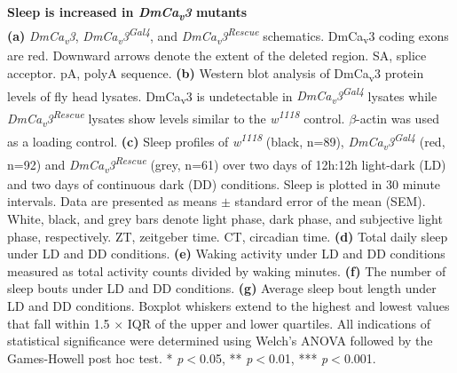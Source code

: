 \label{fig:3}
\textbf{Sleep is increased in \emph{DmCa\textsubscript{v}3} mutants}
\\
\textbf{(a)} \emph{DmCa\textsubscript{v}3}, \emph{DmCa\textsubscript{v}3\textsuperscript{Gal4}}, and \emph{DmCa\textsubscript{v}3\textsuperscript{Rescue}} schematics. 
DmCa\textsubscript{v}3 coding exons are red.
Downward arrows denote the extent of the deleted region.
SA, splice acceptor.
pA, polyA sequence.  
\textbf{(b)} Western blot analysis of DmCa\textsubscript{v}3 protein levels of fly head lysates.
DmCa\textsubscript{v}3 is undetectable in \emph{DmCa\textsubscript{v}3\textsuperscript{Gal4}} lysates while \emph{DmCa\textsubscript{v}3\textsuperscript{Rescue}} lysates show levels similar to the \emph{w\textsuperscript{1118}} control.
$\beta$-actin was used as a loading control.
\textbf{(c)} Sleep profiles of \emph{w\textsuperscript{1118}} (black, n=89), \emph{DmCa\textsubscript{v}3\textsuperscript{Gal4}} (red, n=92) and \emph{DmCa\textsubscript{v}3\textsuperscript{Rescue}}  (grey, n=61) over two days of 12h:12h light-dark (LD) and two days of continuous dark (DD) conditions.
Sleep is plotted in 30 minute intervals.
Data are presented as means $\pm$ standard error of the mean (SEM).
White, black, and grey bars denote light phase, dark phase, and subjective light phase, respectively.
ZT, zeitgeber time.
CT, circadian time.
\textbf{(d)} Total daily sleep under LD and DD conditions.
\textbf{(e)} Waking activity under LD and DD conditions measured as total activity counts divided by waking minutes.
\textbf{(f)} The number of sleep bouts under LD and DD conditions.
\textbf{(g)} Average sleep bout length under LD and DD conditions.
Boxplot whiskers extend to the highest and lowest values that fall within 1.5 $\times$ IQR of the upper and lower quartiles.
All indications of statistical significance were determined using Welch's ANOVA followed by the Games-Howell post hoc test.
* \emph{p}$<$0.05, ** \emph{p}$<$0.01, *** \emph{p}$<$0.001.

  
  